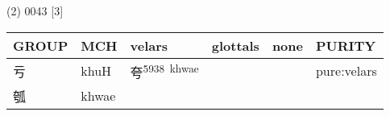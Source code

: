 \documentclass[14pt,a4paper]{scrartcl}
\begin{document}
(2) 0043 {[}3{]}

\begin{longtable}[c]{@{}llllll@{}}
\toprule
\begin{minipage}[b]{0.14\columnwidth}\raggedright\strut
GROUP
\strut\end{minipage} &
\begin{minipage}[b]{0.14\columnwidth}\raggedright\strut
MCH
\strut\end{minipage} &
\begin{minipage}[b]{0.14\columnwidth}\raggedright\strut
velars
\strut\end{minipage} &
\begin{minipage}[b]{0.14\columnwidth}\raggedright\strut
glottals
\strut\end{minipage} &
\begin{minipage}[b]{0.14\columnwidth}\raggedright\strut
none
\strut\end{minipage} &
\begin{minipage}[b]{0.14\columnwidth}\raggedright\strut
PURITY
\strut\end{minipage}\tabularnewline
\midrule
\endhead
\begin{minipage}[t]{0.14\columnwidth}\raggedright\strut
亏
\strut\end{minipage} &
\begin{minipage}[t]{0.14\columnwidth}\raggedright\strut
khuH
\strut\end{minipage} &
\begin{minipage}[t]{0.14\columnwidth}\raggedright\strut
夸\textsuperscript{5938~khwae}
\strut\end{minipage} &
\begin{minipage}[t]{0.14\columnwidth}\raggedright\strut
\strut\end{minipage} &
\begin{minipage}[t]{0.14\columnwidth}\raggedright\strut
\strut\end{minipage} &
\begin{minipage}[t]{0.14\columnwidth}\raggedright\strut
pure:velars
\strut\end{minipage}\tabularnewline
\begin{minipage}[t]{0.14\columnwidth}\raggedright\strut
瓠
\strut\end{minipage} &
\begin{minipage}[t]{0.14\columnwidth}\raggedright\strut
khwae
\strut\end{minipage} &
\begin{minipage}[t]{0.14\columnwidth}\raggedright\strut

\end{minipage}
\end{longtable}
\end{document}

